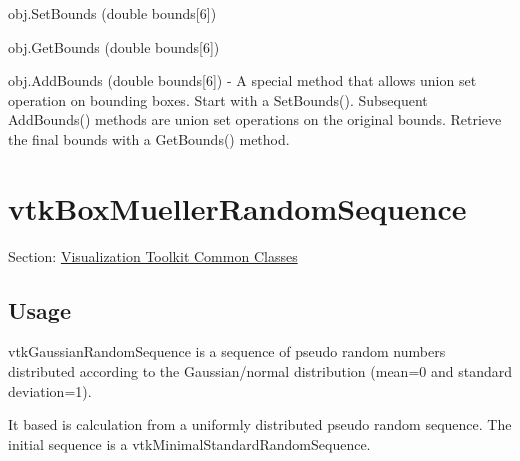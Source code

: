 \begin{DoxyItemize}
\item {\ttfamily obj.\-Set\-Bounds (double bounds\mbox{[}6\mbox{]})}  
\item {\ttfamily obj.\-Get\-Bounds (double bounds\mbox{[}6\mbox{]})}  
\item {\ttfamily obj.\-Add\-Bounds (double bounds\mbox{[}6\mbox{]})} -\/ A special method that allows union set operation on bounding boxes. Start with a Set\-Bounds(). Subsequent Add\-Bounds() methods are union set operations on the original bounds. Retrieve the final bounds with a Get\-Bounds() method.  
\end{DoxyItemize}\hypertarget{vtkcommon_vtkboxmuellerrandomsequence}{}\section{vtk\-Box\-Mueller\-Random\-Sequence}\label{vtkcommon_vtkboxmuellerrandomsequence}
Section\-: \hyperlink{sec_vtkcommon}{Visualization Toolkit Common Classes} \hypertarget{vtkwidgets_vtkxyplotwidget_Usage}{}\subsection{Usage}\label{vtkwidgets_vtkxyplotwidget_Usage}
vtk\-Gaussian\-Random\-Sequence is a sequence of pseudo random numbers distributed according to the Gaussian/normal distribution (mean=0 and standard deviation=1).

It based is calculation from a uniformly distributed pseudo random sequence. The initial sequence is a vtk\-Minimal\-Standard\-Random\-Sequence.

